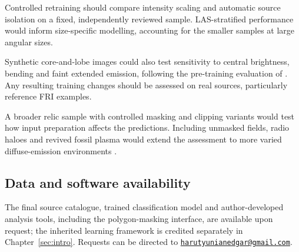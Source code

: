 Controlled retraining should compare intensity scaling and automatic source isolation on a fixed, independently reviewed sample. LAS-stratified performance would inform size-specific modelling, accounting for the smaller samples at large angular sizes.

Synthetic core-and-lobe images could also test sensitivity to central brightness, bending and faint extended emission, following the pre-training evaluation of \citet{Nicolas2025}. Any resulting training changes should be assessed on real sources, particularly reference FRI examples.

A broader relic sample with controlled masking and clipping variants would test how input preparation affects the predictions. Including unmasked fields, radio haloes and revived fossil plasma would extend the assessment to more varied diffuse-emission environments \citep{vanWeeren2019}.

\subsection{Data and software availability}
\label{sec:availability}

The final source catalogue, trained classification model and author-developed analysis tools, including the polygon-masking interface, are available upon request; the inherited learning framework is credited separately in Chapter~\ref{sec:intro}. Requests can be directed to \href{mailto:harutyunianedgar@gmail.com}{\nolinkurl{harutyunianedgar@gmail.com}}.
